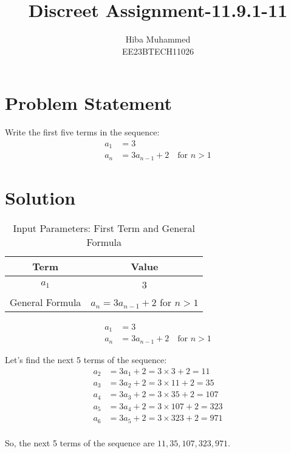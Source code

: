\documentclass[12pt]{article}
\begin{document}
\title{Discreet Assignment-11.9.1-11}
\author{Hiba Muhammed \\
        EE23BTECH11026}
\maketitle

\section*{Problem Statement}
Write the first five terms in the sequence:
\[
\begin{aligned}
a_1 &= 3 \\
a_n &= 3a_{n-1} + 2 \quad \text{for } n > 1
\end{aligned}
\]

\section*{Solution}


\begin{table}[h]
  \centering
  \caption{Input Parameters: First Term and General Formula}
  \begin{tabular}{|c|c|}
    \hline
    \textbf{Term} & \textbf{Value} \\
    \hline
    \(a_1\) & 3 \\
    General Formula & \(a_n = 3a_{n-1} + 2\) for \(n > 1\) \\
    \hline
  \end{tabular}
\end{table}


\[
\begin{aligned}
a_1 &= 3 \\
a_n &= 3a_{n-1} + 2 \quad \text{for } n > 1
\end{aligned}
\]

Let's find the next 5 terms of the sequence:
\[
\begin{aligned}
a_2 &= 3a_1 + 2 = 3 \times 3 + 2 = 11 \\
a_3 &= 3a_2 + 2 = 3 \times 11 + 2 = 35 \\
a_4 &= 3a_3 + 2 = 3 \times 35 + 2 = 107 \\
a_5 &= 3a_4 + 2 = 3 \times 107 + 2 = 323 \\
a_6 &= 3a_5 + 2 = 3 \times 323 + 2 = 971 \\
\end{aligned}
\]

So, the next 5 terms of the sequence are \(11, 35, 107, 323, 971\).
\end{document}
